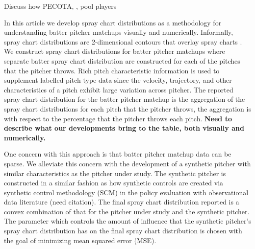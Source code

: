 \documentclass[11pt]{article}
\begin{document}
Discuss how PECOTA, \cite{jensen2009hierarchical}, \cite[Section 2.5]{jensen2009bayesball} pool players 

%


In this article we develop spray chart distributions as a methodology for understanding batter pitcher matchups visually and numerically. Informally, spray chart distributions are 2-dimensional contours that overlay spray charts \citep[Section 12]{marchi2019analyzing}. We construct spray chart distributions for batter pitcher matchups where separate batter spray chart distribution are  constructed for each of the pitches that the pitcher throws. Rich pitch characteristic information is used to supplement labelled pitch type data since the velocity, trajectory, and other characteristics of a pitch exhibit large variation across pitcher. The reported spray chart distribution for the batter pitcher matchup is the aggregation of the spray chart distributions for each pitch that the pitcher throws, the aggregation is with respect to the percentage that the pitcher throws each pitch. {\bf Need to describe what our developments bring to the table, both visually and numerically.}

One concern with this approach is that batter pitcher matchup data can be sparse. We alleviate this concern with the development of a synthetic pitcher with similar characteristics as the pitcher under study. The synthetic pitcher is constructed in a similar fashion as how synthetic controls are created via synthetic control methodology (SCM) \citep{abadie2010synthetic} in the policy evaluation with observational data literature (need citation). The final spray chart distribution reported is a convex combination of that for the pitcher under study and the synthetic pitcher. The parameter which controls the amount of influence that the synthetic pitcher's spray chart distribution has on the final spray chart distribution is chosen with the goal of minimizing mean squared error (MSE).
\end{document}
